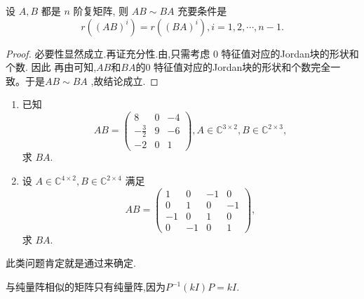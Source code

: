 \documentclass[../../main.tex]{subfiles}%
\begin{document}
\begin{corollary}
设 \( A,B \) 都是 \( n \) 阶复矩阵, 则 \( AB \sim BA \) 充要条件是
\[
r\left( (AB)^i \right) = r\left( (BA)^i \right), i = 1,2,\cdots, n - 1.
\]
\end{corollary}
\begin{proof}
必要性显然成立.再证充分性.由,只需考虑 0 特征值对应的Jordan块的形状和个数. 因此 再由可知,$AB$和$BA$的0 特征值对应的Jordan块的形状和个数完全一致。于是\( AB \sim BA \) ,故结论成立.
\end{proof}

\begin{example}
\begin{enumerate}
\item 已知
\[
AB = \begin{pmatrix}
8 & 0 & -4 \\
-\frac{3}{2} & 9 & -6 \\
-2 & 0 & 1
\end{pmatrix}, A \in \mathbb{C}^{3 \times 2}, B \in \mathbb{C}^{2 \times 3},
\]
求 \( BA \).

\item 设 \( A \in \mathbb{C}^{4 \times 2}, B \in \mathbb{C}^{2 \times 4} \) 满足
\[
AB = \begin{pmatrix}
1 & 0 & -1 & 0 \\
0 & 1 & 0 & -1 \\
-1 & 0 & 1 & 0 \\
0 & -1 & 0 & 1
\end{pmatrix},
\]
求 \( BA \).
\end{enumerate}
\end{example}
\begin{note}
此类问题肯定就是通过来确定.
\end{note}
\begin{remark}
与纯量阵相似的矩阵只有纯量阵,因为$P^{-1}(kI)P=kI$.
\end{remark}
\end{document}
